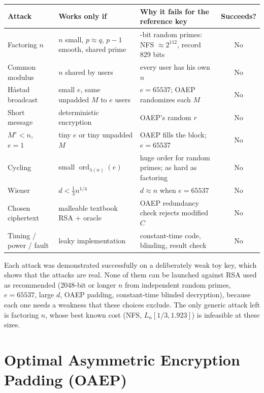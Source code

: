 \begin{center}\small
\begin{tabularx}{\textwidth}{@{}l >{\raggedright\arraybackslash}X >{\raggedright\arraybackslash}X c@{}}
\toprule
Attack & Works only if & Why it fails for the reference key & Succeeds?\\
\midrule
Factoring $n$ & $n$ small, $p \approx q$, $p - 1$ smooth, shared prime & 2048-bit random primes: NFS $\approx 2^{112}$, record 829 bits & No\\
Common modulus & $n$ shared by users & every user has his own $n$ & No\\
H\aa stad broadcast & small $e$, same unpadded $M$ to $e$ users & $e = 65537$; OAEP randomizes each $M$ & No\\
Short message & deterministic encryption & OAEP's random $r$ & No\\
$M^e < n$, $e = 1$ & tiny $e$ or tiny unpadded $M$ & OAEP fills the block; $e = 65537$ & No\\
Cycling & small $\operatorname{ord}_{\lambda(n)}(e)$ & huge order for random primes; as hard as factoring & No\\
Wiener & $d < \frac13 n^{1/4}$ & $d \approx n$ when $e = 65537$ & No\\
Chosen ciphertext & malleable textbook RSA + oracle & OAEP redundancy check rejects modified $C$ & No\\
Timing / power / fault & leaky implementation & constant-time code, blinding, result check & No\\
\bottomrule
\end{tabularx}
\end{center}

\begin{mustknow}
Each attack was demonstrated successfully on a deliberately weak toy key, which shows that the attacks are real. None of them can be launched against RSA used as recommended (2048-bit or longer $n$ from independent random primes, $e = 65537$, large $d$, OAEP padding, constant-time blinded decryption), because each one needs a weakness that these choices exclude. The only generic attack left is factoring $n$, whose best known cost (NFS, $L_n[1/3, 1.923]$) is infeasible at these sizes.
\end{mustknow}

\section{Optimal Asymmetric Encryption Padding (OAEP)}\label{sec:oaep}

